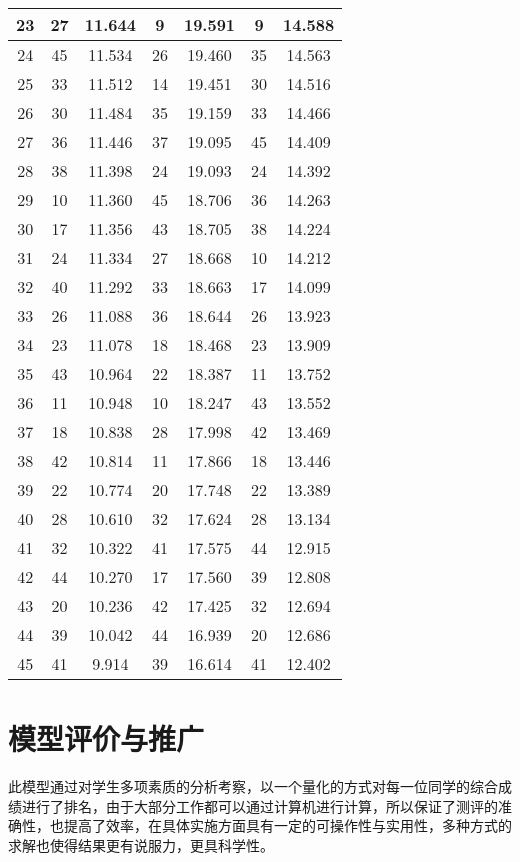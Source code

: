 \documentclass{ctexart}
\begin{document}
\begin{center}
\begin{table}[H]
\begin{tabular}{|c|c|c|c|c|c|c|}
 23 	& 27 	& 11.644 	& 9 	& 19.591 	& 9 	& 14.588\\\hline
 24 	& 45 	& 11.534 	& 26 	& 19.460 	& 35 	& 14.563\\\hline
 25 	& 33 	& 11.512 	& 14 	& 19.451 	& 30 	& 14.516\\\hline
 26 	& 30 	& 11.484 	& 35 	& 19.159 	& 33 	& 14.466\\\hline
 27 	& 36 	& 11.446 	& 37 	& 19.095 	& 45 	& 14.409\\\hline
 28 	& 38 	& 11.398 	& 24 	& 19.093 	& 24 	& 14.392\\\hline
 29 	& 10 	& 11.360 	& 45 	& 18.706 	& 36 	& 14.263\\\hline
 30 	& 17 	& 11.356 	& 43 	& 18.705 	& 38 	& 14.224\\\hline
 31 	& 24 	& 11.334 	& 27 	& 18.668 	& 10 	& 14.212\\\hline
 32 	& 40 	& 11.292 	& 33 	& 18.663 	& 17 	& 14.099\\\hline
 33 	& 26 	& 11.088 	& 36 	& 18.644 	& 26 	& 13.923\\\hline
 34 	& 23 	& 11.078 	& 18 	& 18.468 	& 23 	& 13.909\\\hline
 35 	& 43 	& 10.964 	& 22 	& 18.387 	& 11 	& 13.752\\\hline
 36 	& 11 	& 10.948 	& 10 	& 18.247 	& 43 	& 13.552\\\hline
 37 	& 18 	& 10.838 	& 28 	& 17.998 	& 42 	& 13.469\\\hline
 38 	& 42 	& 10.814 	& 11 	& 17.866 	& 18 	& 13.446\\\hline
 39 	& 22 	& 10.774 	& 20 	& 17.748 	& 22 	& 13.389\\\hline
 40 	& 28 	& 10.610 	& 32 	& 17.624 	& 28 	& 13.134\\\hline
 41 	& 32 	& 10.322 	& 41 	& 17.575 	& 44 	& 12.915\\\hline
 42 	& 44 	& 10.270 	& 17 	& 17.560 	& 39 	& 12.808\\\hline
 43 	& 20 	& 10.236 	& 42 	& 17.425 	& 32 	& 12.694\\\hline
 44 	& 39 	& 10.042 	& 44 	& 16.939 	& 20 	& 12.686\\\hline
 45 	& 41 	& 9.914 	& 39 	& 16.614 	& 41 	& 12.402\\\hline
\end{tabular}
\end{table}
\end{center}

\section{模型评价与推广}
此模型通过对学生多项素质的分析考察，以一个量化的方式对每一位同学的综合成绩进行了排名，由于大部分工作都可以通过计算机进行计算，所以保证了测评的准确性，也提高了效率，在具体实施方面具有一定的可操作性与实用性，多种方式的求解也使得结果更有说服力，更具科学性。
\end{document}
